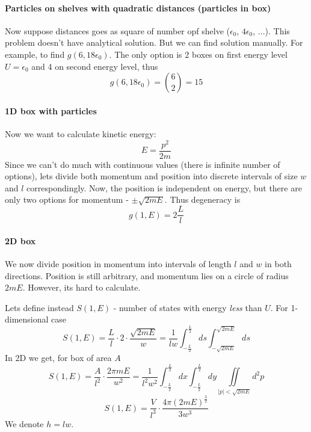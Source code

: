 \paragraph{Particles on shelves with quadratic distances (particles in box)}
Now suppose distances goes as square of number opf shelve ($\epsilon_0$, $4\epsilon_0$, ...). This problem doesn't have analytical solution. But we can find solution manually. For example, to find $g(6,18\epsilon_0)$. The only option is 2 boxes on first energy level $U=\epsilon_0$ and 4 on second energy level, thus 
$$g(6, 18\epsilon_0) = \binom{6}{2}=15$$  
\paragraph{1D box with particles}
Now we want to calculate kinetic energy:
$$E = \frac{p^2}{2m}$$
Since we can't do much with continuous values (there is infinite number of options), lets divide both momentum and position into discrete intervals of size $w$ and $l$ correspondingly. Now, the position is independent on energy, but there are only two options for momentum - $\pm \sqrt{2mE}$. Thus degeneracy is
$$g(1, E) = 2\frac{L}{l} $$
\paragraph{2D box}
We now divide position in momentum into intervals of length $l$ and $w$ in both directions. Position is still arbitrary, and momentum lies on a circle of radius $2mE$. However, its hard to calculate.

Lets define instead $S(1,E)$ - number of states with energy \textit{less} than $U$. For 1-dimensional case 
$$S(1,E)  = \frac{L}{l} \cdot 2 \cdot \frac{\sqrt{2mE}}{w} = \frac{1}{lw} \int_{-\frac{L}{2}}^{\frac{L}{2}} ds \int_{-\sqrt{2mE}}^{\sqrt{2mE}} ds$$
In 2D we get, for box of area $A$
$$S(1,E) = \frac{A}{l^2} \cdot \frac{2\pi m E}{w^2} =  \frac{1}{l^2w^2} \int_{-\frac{L}{2}}^{\frac{L}{2}}dx\int_{-\frac{L}{2}}^{\frac{L}{2}}dy \iint\limits_{|p| < \sqrt{2mE}} d^2p$$
$$S(1,E) = \frac{V}{l^3} \cdot\frac{4\pi (2 m E)^{\frac{3}{2}}}{3w^3}$$
We denote $h=lw$.